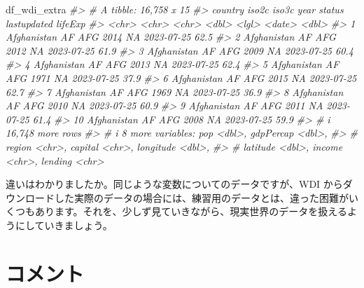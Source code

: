 \documentclass[
  xelatex, ja=standard]{bxjsbook}
\newenvironment{Shaded}{\begin{snugshade}}{\end{snugshade}}
\newcommand{\CommentTok}[1]{\textcolor[rgb]{0.56,0.35,0.01}{\textit{#1}}}
\newcommand{\NormalTok}[1]{#1}
\theoremstyle{definition}
\theoremstyle{definition}
\theoremstyle{definition}
\theoremstyle{definition}
\theoremstyle{remark}
\begin{document}
\begin{Shaded}
\begin{Highlighting}[]
\NormalTok{df\_wdi\_extra}
\CommentTok{\#\textgreater{} \# A tibble: 16,758 x 15}
\CommentTok{\#\textgreater{}    country     iso2c iso3c  year status lastupdated lifeExp}
\CommentTok{\#\textgreater{}    \textless{}chr\textgreater{}       \textless{}chr\textgreater{} \textless{}chr\textgreater{} \textless{}dbl\textgreater{} \textless{}lgl\textgreater{}  \textless{}date\textgreater{}        \textless{}dbl\textgreater{}}
\CommentTok{\#\textgreater{}  1 Afghanistan AF    AFG    2014 NA     2023{-}07{-}25     62.5}
\CommentTok{\#\textgreater{}  2 Afghanistan AF    AFG    2012 NA     2023{-}07{-}25     61.9}
\CommentTok{\#\textgreater{}  3 Afghanistan AF    AFG    2009 NA     2023{-}07{-}25     60.4}
\CommentTok{\#\textgreater{}  4 Afghanistan AF    AFG    2013 NA     2023{-}07{-}25     62.4}
\CommentTok{\#\textgreater{}  5 Afghanistan AF    AFG    1971 NA     2023{-}07{-}25     37.9}
\CommentTok{\#\textgreater{}  6 Afghanistan AF    AFG    2015 NA     2023{-}07{-}25     62.7}
\CommentTok{\#\textgreater{}  7 Afghanistan AF    AFG    1969 NA     2023{-}07{-}25     36.9}
\CommentTok{\#\textgreater{}  8 Afghanistan AF    AFG    2010 NA     2023{-}07{-}25     60.9}
\CommentTok{\#\textgreater{}  9 Afghanistan AF    AFG    2011 NA     2023{-}07{-}25     61.4}
\CommentTok{\#\textgreater{} 10 Afghanistan AF    AFG    2008 NA     2023{-}07{-}25     59.9}
\CommentTok{\#\textgreater{} \# i 16,748 more rows}
\CommentTok{\#\textgreater{} \# i 8 more variables: pop \textless{}dbl\textgreater{}, gdpPercap \textless{}dbl\textgreater{},}
\CommentTok{\#\textgreater{} \#   region \textless{}chr\textgreater{}, capital \textless{}chr\textgreater{}, longitude \textless{}dbl\textgreater{},}
\CommentTok{\#\textgreater{} \#   latitude \textless{}dbl\textgreater{}, income \textless{}chr\textgreater{}, lending \textless{}chr\textgreater{}}
\end{Highlighting}
\end{Shaded}

違いはわかりましたか。同じような変数についてのデータですが、WDI からダウンロードした実際のデータの場合には、練習用のデータとは、違った困難がいくつもあります。それを、少しず見ていきながら、現実世界のデータを扱えるようにしていきましょう。

\hypertarget{ux30b3ux30e1ux30f3ux30c8}{%
\section{コメント}\label{ux30b3ux30e1ux30f3ux30c8}}
\end{document}

